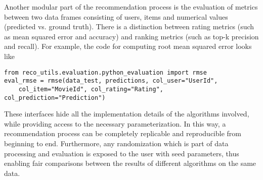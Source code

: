 Another modular part of the recommendation process is the evaluation of metrics between two data frames consisting of users, items and numerical values 
(predicted vs. ground truth). There is a distinction between rating metrics (such as mean squared error and accuracy) and ranking metrics 
(such as top-k precision and recall). For example, the code for computing root mean squared error looks like
\begin{verbatim}
from reco_utils.evaluation.python_evaluation import rmse
eval_rmse = rmse(data_test, predictions, col_user="UserId", 
    col_item="MovieId", col_rating="Rating", col_prediction="Prediction")
\end{verbatim}
 
These interfaces hide all the implementation details of the algorithms involved, while providing access to the necessary parameterization.
In this way, a recommendation process can be completely replicable and reproducible from beginning to end. Furthermore, any randomization 
which is part of data processing and evaluation is exposed to the user with seed parameters, thus enabling fair comparisons between the results of different algorithms
on the same data. 

